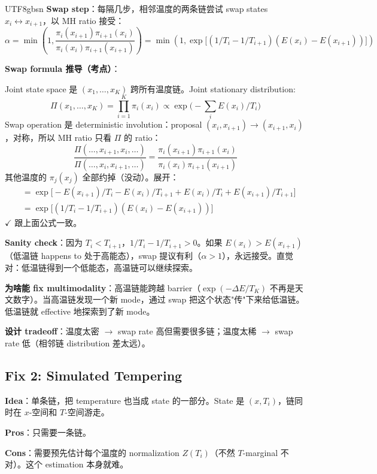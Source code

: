 \documentclass[11pt]{article}
\begin{document}
\begin{CJK}{UTF8}{gbsn}
\textbf{Swap step}：每隔几步，相邻温度的两条链尝试 swap states $x_i \leftrightarrow x_{i+1}$，以 MH ratio 接受：
\[
\alpha = \min\!\left(1, \frac{\pi_i(x_{i+1}) \pi_{i+1}(x_i)}{\pi_i(x_i) \pi_{i+1}(x_{i+1})}\right) = \min\!\left(1, \exp\!\big[(1/T_i - 1/T_{i+1})(E(x_i) - E(x_{i+1}))\big]\right)
\]

\textbf{Swap formula 推导（考点）}：

Joint state space 是 $(x_1, \ldots, x_K)$ 跨所有温度链。Joint stationary distribution:
\[
\Pi(x_1, \ldots, x_K) = \prod_{i=1}^K \pi_i(x_i) \propto \exp\!\Big(-\sum_i E(x_i)/T_i\Big)
\]
Swap operation 是 deterministic involution：proposal $(x_i, x_{i+1}) \to (x_{i+1}, x_i)$，对称，所以 MH ratio 只看 $\Pi$ 的 ratio：
\[
\frac{\Pi(\ldots, x_{i+1}, x_i, \ldots)}{\Pi(\ldots, x_i, x_{i+1}, \ldots)} = \frac{\pi_i(x_{i+1}) \pi_{i+1}(x_i)}{\pi_i(x_i) \pi_{i+1}(x_{i+1})}
\]
其他温度的 $\pi_j(x_j)$ 全部约掉（没动）。展开：
\begin{align*}
&= \exp\!\big[-E(x_{i+1})/T_i - E(x_i)/T_{i+1} + E(x_i)/T_i + E(x_{i+1})/T_{i+1}\big] \\
&= \exp\!\big[(1/T_i - 1/T_{i+1})(E(x_i) - E(x_{i+1}))\big]
\end{align*}
$\checkmark$ 跟上面公式一致。

\textbf{Sanity check}：因为 $T_i < T_{i+1}$，$1/T_i - 1/T_{i+1} > 0$。如果 $E(x_i) > E(x_{i+1})$（低温链 happens to 处于高能态），swap 提议有利（$\alpha > 1$），永远接受。直觉对：低温链得到一个低能态，高温链可以继续探索。

\textbf{为啥能 fix multimodality}：高温链能跨越 barrier（$\exp(-\Delta E / T_K)$ 不再是天文数字）。当高温链发现一个新 mode，通过 swap 把这个状态"传"下来给低温链。低温链就 effective 地探索到了新 mode。

\textbf{设计 tradeoff}：温度太密 $\to$ swap rate 高但需要很多链；温度太稀 $\to$ swap rate 低（相邻链 distribution 差太远）。

\subsection{Fix 2: Simulated Tempering}

\textbf{Idea}：单条链，把 temperature 也当成 state 的一部分。State 是 $(x, T_i)$，链同时在 $x$-空间和 $T$-空间游走。

\textbf{Pros}：只需要一条链。

\textbf{Cons}：需要预先估计每个温度的 normalization $Z(T_i)$（不然 $T$-marginal 不对）。这个 estimation 本身就难。


\end{CJK}
\end{document}
